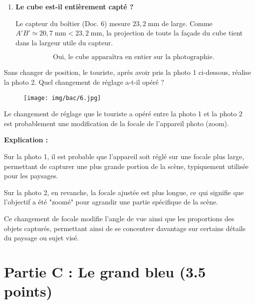\documentclass[answers]{exam}
\begin{document}
\begin{questions}
\begin{solution}
\begin{enumerate}[label=\textbf{(\alph*)}]
  \item  \textbf{Le cube est-il entièrement capté ?}

        Le capteur du boîtier (Doc. 6) mesure \(23{,}2\;\text{mm}\) de large.  
        Comme \(A'B' \simeq 20,7\;\text{mm} < 23,2\;\text{mm}\), la projection de toute la façade du cube tient dans la largeur utile du capteur.  

        \[
          \boxed{\text{Oui, le cube apparaîtra en entier sur la photographie.}}
        \]

\end{enumerate}


\end{solution}

\question[1] Sans changer de position, le touriste, après avoir pris la photo 1 ci-dessous, réalise la photo 2. Quel changement de réglage a-t-il opéré ?

\begin{figure}[H]
  \centering
  \texttt{[image: img/bac/6.jpg]}
\end{figure}

\end{questions}



\begin{solution}
Le changement de réglage que le touriste a opéré entre la photo 1 et la photo 2 est probablement une modification de la focale de l'appareil photo (zoom). 

\begin{addmargin}[1em]{0em}
\textbf{Explication :} 
\begin{compactitem}
    \item Sur la photo 1, il est probable que l'appareil soit réglé sur une focale plus large, permettant de capturer une plus grande portion de la scène, typiquement utilisée pour les paysages.
    \item Sur la photo 2, en revanche, la focale ajustée est plus longue, ce qui signifie que l'objectif a été "zoomé" pour agrandir une partie spécifique de la scène.
\end{compactitem}
Ce changement de focale modifie l'angle de vue ainsi que les proportions des objets capturés, permettant ainsi de se concentrer davantage sur certains détails du paysage ou sujet visé.
\end{addmargin}
\end{solution}

\section*{Partie C : Le grand bleu (3.5 points)}
\end{document}
